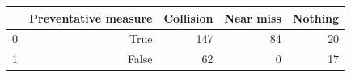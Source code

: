 \begin{tabular}{lrrrr}
\toprule
 & Preventative measure & Collision & Near miss & Nothing \\
\midrule
0 & True & 147 & 84 & 20 \\
1 & False & 62 & 0 & 17 \\
\bottomrule
\end{tabular}
